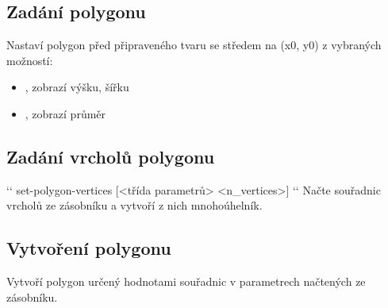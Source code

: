 \documentclass[letterpaper,10pt,czech]{sphinxmanual}
\begin{document}
\subsection{Zadání polygonu}
\label{\detokenize{parameter-programs:zadani-polygonu}}
 Nastaví polygon
před připraveného tvaru se středem na (x0, y0) z vybraných možností:
\begin{itemize}
\item {} 
, zobrazí výšku, šířku

\item {} 
, zobrazí průměr

\end{itemize}


\subsection{Zadání vrcholů polygonu}
\label{\detokenize{parameter-programs:zadani-vrcholu-polygonu}}
{}`{}` set-polygon-vertices {[}\textless{}třída parametrů\textgreater{} \textless{}n\_vertices\textgreater{}{]} {}`{}` Načte  souřadnic vrcholů ze zásobníku a vytvoří z nich mnohoúhelník.


\subsection{Vytvoření polygonu}
\label{\detokenize{parameter-programs:vytvoreni-polygonu}}
Vytvoří polygon určený hodnotami souřadnic v parametrech načtených ze zásobníku.
\end{document}
